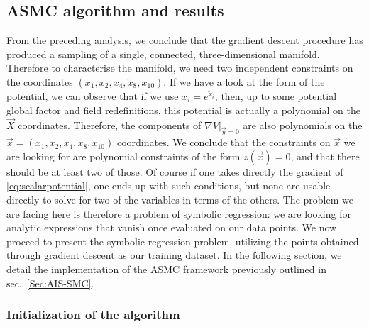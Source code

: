 \documentclass[11pt,a4paper]{article}
\begin{document}
	\subsection{ASMC algorithm and results}  \label{sec:AIS-SMC_application}
	From the preceding analysis, we conclude that the gradient descent procedure has produced a sampling of a single, connected, three-dimensional manifold. Therefore to characterise the manifold, we need two independent constraints on the coordinates $(x_1,x_2,x_4,\tilde{x}_8,x_{10})$. If we have a look at the form of the potential, we can observe that if we use $x_{i} = e^{\tilde{x}_i}$, then, up to some potential global factor and field redefinitions, this potential is actually a polynomial on the $\vec{X}$ coordinates. Therefore, the components of $\left.\nabla V\right|_{\vec{y}=0}$ are also polynomials on the $\vec{x} = (x_1,x_2,x_4,x_8,x_{10})$ coordinates. We conclude that the constraints on $\vec{x}$ we are looking for are polynomial constraints of the form $z(\vec{x}) = 0$, and that there should be at least two of those. Of course if one takes directly the gradient of \eqref{eq:scalarpotential}, one ends up with such conditions, but none are usable directly to solve for two of the variables in terms of the others. The problem we are facing here is therefore a problem of symbolic regression: we are looking for analytic expressions that vanish once evaluated on our data points. We now proceed to present the symbolic regression problem, utilizing the points obtained through gradient descent as our training dataset. In the following section, we detail the implementation of the ASMC framework previously outlined in sec.~\ref{Sec:AIS-SMC}.
	
	
	\subsubsection{Initialization of the algorithm}
	
\end{document}
